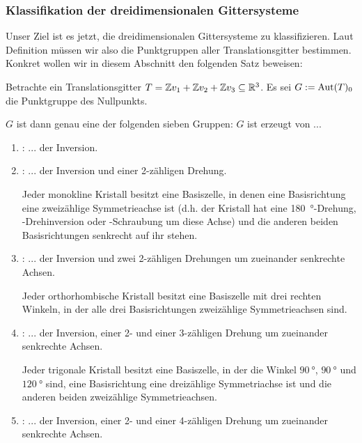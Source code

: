 \subsubsection{Klassifikation der dreidimensionalen Gittersysteme}

\begin{remark}
Unser Ziel ist es jetzt, die dreidimensionalen Gittersysteme zu klassifizieren. Laut Definition müssen wir also die Punktgruppen aller Translationsgitter bestimmen. Konkret wollen wir in diesem Abschnitt den folgenden Satz beweisen:
\end{remark}

\begin{theoremdef}
Betrachte ein Translationsgitter $T=\mathbb{Z} v_1+\mathbb{Z} v_2+\mathbb{Z} v_3\subseteq\mathbb{R}^3$. Es sei $G:=\operatorname{Aut}(T)_0$ die Punktgruppe des Nullpunkts.

$G$ ist dann genau eine der folgenden sieben Gruppen: $G$ ist erzeugt von ...
\begin{enumerate}
\item {}: ... der Inversion.

\item {}: ... der Inversion und einer 2-zähligen Drehung.

Jeder monokline Kristall besitzt eine Basiszelle, in denen eine Basisrichtung eine zweizählige Symmetrieachse ist (d.h. der Kristall hat eine \SI{180}{\degree}-Drehung, -Drehinversion oder -Schraubung um diese Achse) und die anderen beiden Basisrichtungen senkrecht auf ihr stehen.

\item {}: ... der Inversion und zwei 2-zähligen Drehungen um zueinander senkrechte Achsen.

Jeder orthorhombische Kristall besitzt eine Basiszelle mit drei rechten Winkeln, in der alle drei Basisrichtungen zweizählige Symmetrieachsen sind.

\item {}: ... der Inversion, einer 2- und einer 3-zähligen Drehung um zueinander senkrechte Achsen.

Jeder trigonale Kristall besitzt eine Basiszelle, in der die Winkel $\SI{90}{\degree}$, $\SI{90}{\degree}$ und $\SI{120}{\degree}$ sind, eine Basisrichtung eine dreizählige Symmetriachse ist und die anderen beiden zweizählige Symmetrieachsen.

\item {}: ... der Inversion, einer 2- und einer 4-zähligen Drehung um zueinander senkrechte Achsen.


\end{enumerate}
\end{theoremdef}
